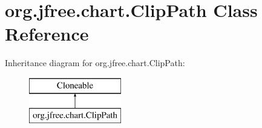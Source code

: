\hypertarget{classorg_1_1jfree_1_1chart_1_1_clip_path}{}\section{org.\+jfree.\+chart.\+Clip\+Path Class Reference}
\label{classorg_1_1jfree_1_1chart_1_1_clip_path}
Inheritance diagram for org.\+jfree.\+chart.\+Clip\+Path\+:\begin{figure}[H]
\begin{center}
\leavevmode
\includegraphics[height=2.000000cm]{classorg_1_1jfree_1_1chart_1_1_clip_path}
\end{center}
\end{figure}
